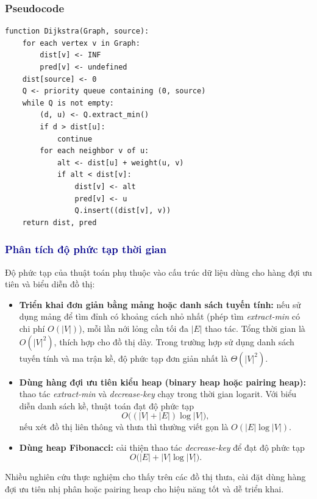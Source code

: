\documentclass[14pt,a4paper]{report}
\begin{document}
\subsubsection{Pseudocode}
\begin{verbatim}
function Dijkstra(Graph, source):
    for each vertex v in Graph:
        dist[v] <- INF
        pred[v] <- undefined
    dist[source] <- 0
    Q <- priority queue containing (0, source)
    while Q is not empty:
        (d, u) <- Q.extract_min()
        if d > dist[u]:
            continue
        for each neighbor v of u:
            alt <- dist[u] + weight(u, v)
            if alt < dist[v]:
                dist[v] <- alt
                pred[v] <- u
                Q.insert((dist[v], v))
    return dist, pred
\end{verbatim}

\subsubsection{\textcolor{darkblue}{Phân tích độ phức tạp thời gian}}
Độ phức tạp của thuật toán phụ thuộc vào cấu trúc dữ liệu dùng cho hàng đợi ưu tiên và biểu diễn đồ thị:
\begin{itemize}
    \item \textbf{Triển khai đơn giản bằng mảng hoặc danh sách tuyến tính:} nếu sử dụng mảng để tìm đỉnh có khoảng cách nhỏ nhất (phép tìm \textit{extract-min} có chi phí $O(|V|)$), mỗi lần nới lỏng  cần tối đa $|E|$ thao tác. Tổng thời gian là $O(|V|^2)$, thích hợp cho đồ thị dày. Trong trường hợp sử dụng danh sách tuyến tính và ma trận kề, độ phức tạp đơn giản nhất là $\Theta(|V|^2)$.
    \item \textbf{Dùng hàng đợi ưu tiên kiểu heap (binary heap hoặc pairing heap):} thao tác \textit{extract-min} và \textit{decrease-key} chạy trong thời gian logarit. Với biểu diễn danh sách kề, thuật toán đạt độ phức tạp
    \[
        O\big((|V|+|E|)\log |V|\big),
    \]
    nếu xét đồ thị liên thông và thưa thì thường viết gọn là $O(|E|\log|V|)$.
    \item \textbf{Dùng heap Fibonacci:} cải thiện thao tác \textit{decrease-key} để đạt độ phức tạp
    \[
        O\big(|E| + |V|\log|V|\big).
    \]
\end{itemize}

Nhiều nghiên cứu thực nghiệm cho thấy trên các đồ thị thưa, cài đặt dùng hàng đợi ưu tiên nhị phân hoặc pairing heap cho hiệu năng tốt và dễ triển khai.
\end{document}
